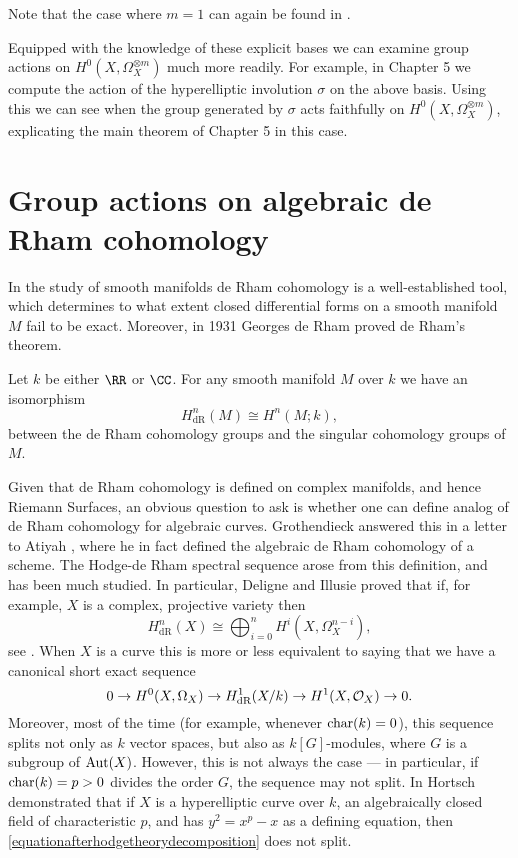 Note that the case where $m=1$ can again be found in \cite[Prop. 7.4.26]{liu}.

Equipped with the knowledge of these explicit bases we can examine group actions on $H^0(X,\Omega_X^{\otimes m})$ much more readily.
For example, in Chapter 5 we compute the action of the hyperelliptic involution $\sigma$ on the above basis.
Using this we can see when the group generated by $\sigma$ acts faithfully on $H^0(X,\Omega_X^{\otimes m})$, explicating the main theorem of Chapter 5 in this case.

\section{Group actions on algebraic de Rham cohomology}

In the study of smooth manifolds de Rham cohomology is a well-established tool, which determines to what extent closed differential forms on a smooth manifold $M$ fail to be exact.
Moreover, in 1931 Georges de Rham \cite{derhamstheorem} proved de Rham's theorem.
    \begin{unnumthm}
    Let $k$ be either $\RR$ or $\CC$.
    For any smooth manifold $M$ over $k$ we have an isomorphism
        \[
        H^n_{\text{dR}}(M) \cong H^n(M;k),
        \]
    between the de Rham cohomology groups and the singular cohomology groups of $M$.
    \end{unnumthm}

Given that de Rham cohomology is defined on complex manifolds, and hence Riemann Surfaces, an obvious question to ask is whether one can define analog of de Rham cohomology for algebraic curves.
Grothendieck answered this in a letter to Atiyah \cite{grothendiecklettertoatiyah}, where he in fact defined the algebraic de Rham cohomology of a scheme.
The Hodge-de Rham spectral sequence arose from this definition, and has been much studied.
In particular, Deligne and Illusie proved that if, for example, $X$ is a complex, projective variety then
    \begin{equation*}
    H^n_{\text{dR}}(X) \cong \bigoplus_{i=0}^n H^i(X,\Omega_X^{n-i}),
    \end{equation*}
see \cite{deligneillusie}.
When $X$ is a curve this is more or less equivalent to saying that we have a canonical short exact sequence
    \begin{equation}\label{equationafterhodgetheorydecomposition}
    0 \rightarrow {H^0(X,\Omega_X)} \rightarrow H_{\text {dR}}^1(X/k) \rightarrow H^1(X,\mathcal{O}_X) \rightarrow 0.
    \end{equation}
Moreover, most of the time (for example, whenever $\operatorname{char}(k) = 0$), this sequence splits not only as $k$ vector spaces, but also as $k[G]$-modules, where $G$ is a subgroup of $\operatorname{Aut}(X)$.
However, this is not always the case --- in particular, if $\operatorname{char}(k) = p >0$ divides the order $G$, the sequence may not split.
In \cite{canonicalrepresentation} Hortsch demonstrated that if $X$ is a hyperelliptic curve over $k$, an algebraically closed field of characteristic $p$, and has $y^2 = x^p-x$ as a defining equation, then \eqref{equationafterhodgetheorydecomposition} does not split.


